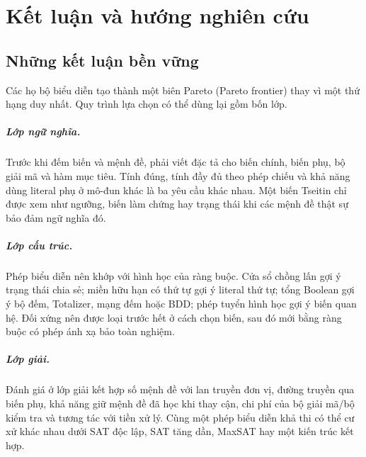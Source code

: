 \chapter{Kết luận và hướng nghiên cứu}


\section{Những kết luận bền vững}

Các họ bộ biểu diễn tạo thành một biên Pareto (Pareto frontier) thay vì một thứ hạng duy nhất. Quy
trình lựa chọn có thể dùng lại gồm bốn lớp.

\paragraph{Lớp ngữ nghĩa.}
Trước khi đếm biến và mệnh đề, phải viết đặc tả cho biến chính, biến phụ, bộ
giải mã và hàm mục tiêu. Tính đúng, tính đầy đủ theo phép chiếu và khả năng dùng
literal phụ ở mô-đun khác là ba yêu cầu khác nhau. Một biến Tseitin chỉ được
xem như ngưỡng, biến làm chứng hay trạng thái khi các mệnh đề thật sự bảo đảm ngữ
nghĩa đó.

\paragraph{Lớp cấu trúc.}
Phép biểu diễn nên khớp với hình học của ràng buộc. Cửa sổ chồng lấn gợi ý trạng
thái chia sẻ; miền hữu hạn có thứ tự gợi ý literal thứ tự; tổng Boolean gợi
ý bộ đếm, Totalizer, mạng đếm hoặc BDD; phép tuyển hình học gợi ý biến quan hệ.
Đối xứng nên được loại trước hết ở cách chọn biến, sau đó mới bằng ràng buộc có
phép ánh xạ bảo toàn nghiệm.

\paragraph{Lớp giải.}
Đánh giá ở lớp giải kết hợp số mệnh đề với lan truyền đơn vị, đường truyền qua
biến phụ, khả năng giữ mệnh đề đã học khi thay cận, chi phí của bộ giải mã/bộ
kiểm tra và tương tác với tiền xử lý. Cùng một phép biểu diễn khả thi có thể cư xử
khác nhau dưới SAT độc lập, SAT tăng dần, MaxSAT hay một kiến trúc kết hợp.

